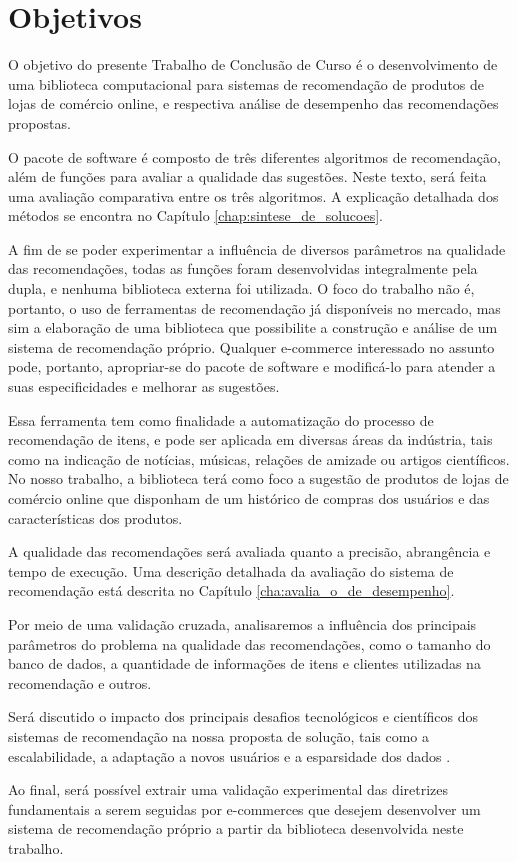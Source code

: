 \chapter[Objetivos]{Objetivos}
\label{chap:objetivos}

O objetivo do presente Trabalho de Conclusão de Curso é o desenvolvimento de uma biblioteca computacional para sistemas de recomendação de produtos de lojas de comércio online, e respectiva análise de desempenho das recomendações propostas. 

O pacote de software é composto de três diferentes algoritmos de recomendação, além de funções para avaliar a qualidade das sugestões. Neste texto, será feita uma avaliação comparativa entre os três algoritmos. A explicação detalhada dos métodos se encontra no Capítulo \ref{chap:sintese_de_solucoes}.  

A fim de se poder experimentar a influência de diversos parâmetros na qualidade das recomendações, todas as funções foram desenvolvidas integralmente pela dupla, e nenhuma biblioteca externa foi utilizada. O foco do trabalho não é, portanto, o uso de ferramentas de recomendação já disponíveis no mercado, mas sim a elaboração de uma biblioteca que possibilite a construção e análise de um sistema de recomendação  próprio. Qualquer e-commerce interessado no assunto pode, portanto, apropriar-se do pacote de software e modificá-lo para atender a suas especificidades e melhorar as sugestões.

Essa ferramenta tem como finalidade a automatização do processo de recomendação de itens, e pode ser aplicada em diversas áreas da indústria, tais como na indicação de notícias, músicas, relações de amizade ou artigos científicos. No nosso trabalho, a biblioteca terá como foco a sugestão de produtos de lojas de comércio online que disponham de um histórico de compras dos usuários e das características dos produtos.

A qualidade das recomendações será avaliada quanto a precisão, abrangência e tempo de execução. Uma descrição detalhada da avaliação do sistema de recomendação está descrita no Capítulo \ref{cha:avalia_o_de_desempenho}.

Por meio de uma validação cruzada, analisaremos a influência dos principais parâmetros do problema na qualidade das recomendações, como o tamanho do banco de dados, a quantidade de informações de itens e clientes utilizadas na recomendação e outros.

Será discutido o impacto dos principais desafios tecnológicos e científicos dos sistemas de recomendação na nossa proposta de solução, tais como a escalabilidade, a adaptação a novos usuários e a esparsidade dos dados \cite{sarwar2000analysis}.

Ao final, será possível extrair uma validação experimental das diretrizes fundamentais a serem seguidas por e-commerces que desejem desenvolver um sistema de recomendação próprio a partir da biblioteca desenvolvida neste trabalho. 